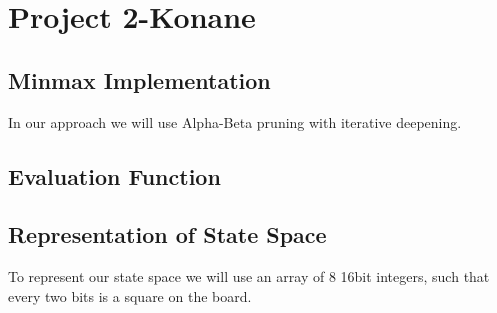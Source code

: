 \documentclass[12pt]{article}
\begin{document}
\section*{Project 2-Konane}

\subsection*{Minmax Implementation}
In our approach we will use Alpha-Beta pruning with iterative deepening.

\subsection*{Evaluation Function}

\subsection*{Representation of State Space}
To represent our state space we will use an array of 8 16bit integers, such that every two bits is a square on the board.
\end{document}
